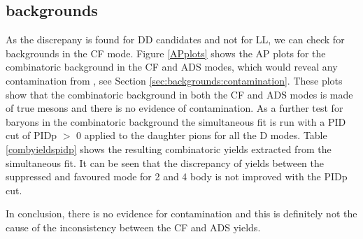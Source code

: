 \subsection{\KS backgrounds}

As the discrepany is found for DD candidates and not for LL, we can check for \KS backgrounds in the CF mode. Figure \ref{APplots} shows the AP plots for the combinatoric background in the CF and ADS modes, which would reveal any contamination from \Lz, see Section \ref{sec:backgrounds:contamination}. These plots show that the combinatoric background in both the CF and ADS modes is made of true \KS mesons and there is no evidence of \Lz contamination. As a further test for \Lz baryons in the combinatoric background the simultaneous fit is run with a PID cut of PIDp $>$ 0 applied to the \KS daughter pions for all the D modes. Table \ref{combyieldspidp} shows the resulting combinatoric yields extracted from the simultaneous fit. It can be seen that the discrepancy of yields between the suppressed and favoured mode for 2 and 4 body is not improved with the PIDp cut. 

In conclusion, there is no evidence for \Lz contamination and this is definitely not the cause of the inconsistency between the CF and ADS yields.

